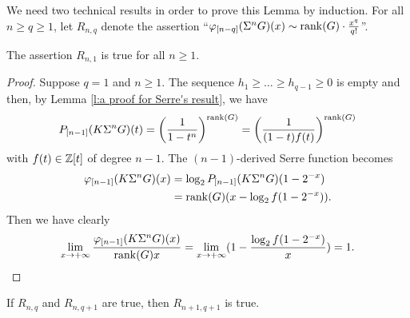 We need two technical results in order to prove this Lemma by induction. For all $n\geq q\geq1$, let $R_{n,q}$ denote the assertion ``$\varphi_{[n-q]}(\Sigma^n G)(x)\sim \operatorname{rank}(G)\cdot\frac{x^q}{q!}$''.

\begin{lem}\label{l:9.1-first step}
The assertion $R_{n,1}$ is true for all $n\geq1$.
\end{lem}

\begin{proof}
Suppose $q=1$ and $n\geq1$. The sequence $h_1\geq\dots\geq h_{q-1}\geq0$ is empty and then, by Lemma \ref{l:a proof for Serre's result}, we have 
$$
P_{[n-1]}(K\Sigma^n G)(t)=\left({1\over 1-t^n}\right)^{\operatorname{rank}(G)}=\left({1\over (1-t)f(t)}\right)^{\operatorname{rank}(G)}
$$ with $f(t)\in\mathbb{Z}[t]$ of degree $n-1$. The $(n-1)$-derived Serre function becomes
\begin{align*}
\varphi_{[n-1]}(K\Sigma^n G)(x) &=\log_2 P_{[n-1]}(K\Sigma^n G)(1-2^{-x})\\
&=\operatorname{rank}(G)(x-\log_2 f(1-2^{-x})).
\end{align*} Then we have clearly
$$
\lim_{x\to+\infty}{\varphi_{[n-1]}(K\Sigma^n G)(x)\over \operatorname{rank}(G)x}=\lim_{x\to+\infty}(1-{\log_2 f(1-2^{-x})\over x})=1.
$$
\end{proof}

\begin{lem}\label{l:9.1-induction}
If $R_{n,q}$ and $R_{n,q+1}$ are true, then $R_{n+1,q+1}$ is true.
\end{lem}

